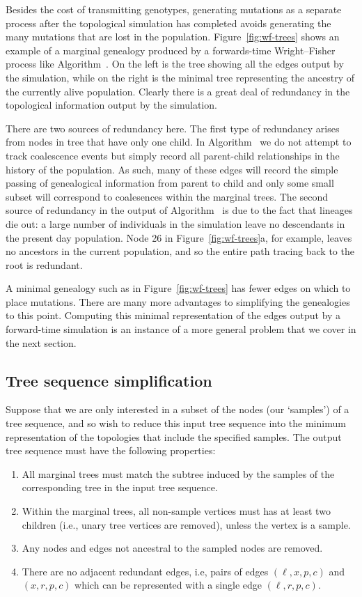 \documentclass{article}
\begin{document}
Besides the cost of transmitting genotypes,
generating mutations as a separate process after the topological simulation has completed 
avoids generating the many mutations that are lost in the population. 
Figure~\ref{fig:wf-trees} shows
an example of a marginal genealogy produced by a forwards-time Wright--Fisher
process like Algorithm~. 
On the left is the tree showing all the edges output by the simulation, 
while on the right
is the minimal tree representing the ancestry of the currently alive
population. Clearly there is a great deal of redundancy in the topological
information output by the simulation.

There are two sources of redundancy here. The first type of redundancy arises
from nodes in tree that have only one child. In Algorithm~ we do
not attempt to track coalescence events but simply record all parent-child
relationships in the history of the population. As such, many of these edges
will record the simple passing of genealogical information from parent to child
and only some small subset will correspond to coalesences within the marginal
trees. The second source of redundancy in the output of Algorithm~
is due to the fact that lineages die out: a large number of
individuals in the simulation leave no descendants in the present day population. 
Node 26 in Figure~\ref{fig:wf-trees}a, for example, leaves no
ancestors in the current population, and so the entire path tracing back to
the root is redundant.

A minimal genealogy such as in Figure~\ref{fig:wf-trees}
has fewer edges on which to place mutations.
There are many more advantages to simplifying the genealogies to this point.
Computing this minimal representation of the
edges output by a forward-time simulation is an instance of a more
general problem that we cover in the next section.


\subsection*{Tree sequence simplification}

Suppose that we are only interested in a subset of the nodes (our `samples')
of a tree sequence,
and so wish to reduce this input tree sequence
into the minimum representation of the topologies that include the specified
samples. The output tree sequence must have the following properties:
\begin{enumerate}
\item All marginal trees must match the subtree induced by the samples of the corresponding tree in the input tree sequence.
\item Within the marginal trees, all non-sample vertices must has at least
two children (i.e., unary tree vertices are removed), unless the vertex is a sample.
\item Any nodes and edges not ancestral to the sampled nodes are removed.
\item There are no adjacent redundant edges, i.e, pairs of edges $(\ell, x, p,
c)$ and $(x, r, p, c)$ which can be represented with a single edge
$(\ell, r, p, c)$.
\end{enumerate}
\end{document}
